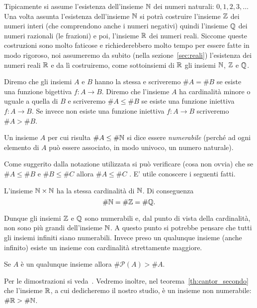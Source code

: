 Tipicamente si assume l'esistenza dell'insieme $\mathbb N$ dei numeri naturali: $0,1,2,3,\dots$
Una volta assunta l'esistenza dell'insieme $\mathbb N$ si potrà costruire l'insieme
$\mathbb Z$ dei numeri interi (che comprendono anche i numeri negativi) quindi
l'insieme $\mathbb Q$ dei numeri razionali (le frazioni) e poi,
l'insieme $\mathbb R$ dei numeri reali.
Siccome queste costruzioni sono molto faticose
e richiederebbero molto tempo per essere fatte in modo rigoroso, noi
assumeremo da subito (nella sezione~\ref{sec:reali})
l'esistenza dei numeri reali $\mathbb R$ e da lì costruiremo,
come sottoinsiemi di $\mathbb R$ gli insiemi $\mathbb N$, $\mathbb Z$ e $\mathbb Q$.

\begin{definition}[cardinalità]
Diremo che gli insiemi $A$ e $B$ hanno la stessa 
e scriveremo $\# A = \# B$
se esiste una funzione bigettiva $f\colon A \to B$.
Diremo che l'insieme $A$ ha cardinalità minore o uguale a quella di $B$
e scriveremo $\#A \le \#B$ se esiste una funzione iniettiva $f\colon A \to B$.
Se invece non esiste una funzione iniettiva $f\colon A \to B$ scriveremo
$\#A > \#B$.

Un insieme $A$ per cui risulta $\#A \le \#\mathbb N$ si dice essere \emph{numerabile}
(perché ad ogni elemento di $A$ può essere associato, in modo univoco, un numero
naturale).
\end{definition}

Come suggerito dalla notazione utilizzata si può verificare (cosa non ovvia)
che se $\#A \le \#B$ e $\#B \le \#C$ allora $\#A \le \#C$
\cite[teorema di Cantor-Bernstein]{appunti_logica}.
E' utile conoscere i seguenti fatti.

\begin{theorem}
  L'insieme $\mathbb N \times \mathbb N$ ha la stessa cardinalità di $\mathbb N$. Di conseguenza
  \[
    \# \mathbb N = \# \mathbb Z = \# \mathbb Q.
  \]
\end{theorem}

Dunque gli insiemi $\mathbb Z$ e $\mathbb Q$ sono numerabili e, dal punto di vista della cardinalità,
non sono più grandi dell'insieme $\mathbb N$.
A questo punto si potrebbe pensare che
tutti gli insiemi infiniti siano numerabili.
Invece preso un qualunque insieme (anche infinito)
esiste un insieme con cardinalità strettamente maggiore.
%
\begin{theorem}[Cantor]
  Se $A$ è un qualunque insieme allora $\# \mathcal P(A)> \# A$.
\end{theorem}
Per le dimostrazioni si veda~\cite{appunti_logica}.
%
Vedremo inoltre, nel teorema~\ref{th:cantor_secondo}
che l'insieme $\mathbb R$, a cui dedicheremo il nostro studio,
è un insieme non numerabile: $\#\mathbb R > \#\mathbb N$.

